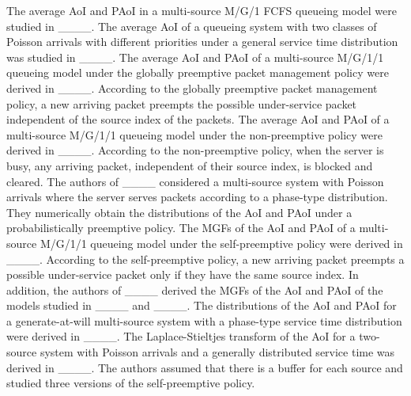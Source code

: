 The average AoI and PAoI in a multi-source M/G/1 FCFS queueing model were studied in    
____.
The average AoI of a queueing system with two classes of Poisson arrivals with different priorities under a general service time distribution was studied in ____. 
The average AoI and PAoI of a multi-source M/G/1/1 queueing model under the globally preemptive packet management policy were derived in ____.  According to the globally preemptive packet management policy, a new arriving packet preempts the possible under-service packet independent of the source index of the packets.
The average AoI and PAoI of a multi-source M/G/1/1 queueing model under the non-preemptive policy were derived in ____. According to the non-preemptive policy, when the server is busy, any arriving packet, independent of their source index, is blocked and cleared.  
 The authors of ____ considered a multi-source system with Poisson arrivals where the server serves packets according to a phase-type distribution. 
 They numerically obtain the distributions of the AoI and PAoI under a probabilistically preemptive policy. 
The MGFs of the AoI and PAoI of a multi-source M/G/1/1 queueing model under the self-preemptive policy were derived in ____. According to the self-preemptive policy, a new arriving packet preempts a possible under-service packet only if they have the same source index. In addition, the authors of ____ derived the MGFs of the AoI and PAoI of the models studied in ____ and ____.
The distributions of the AoI and PAoI for a generate-at-will multi-source system with a phase-type service time distribution were derived in ____.
The Laplace-Stieltjes transform of the AoI for a two-source system with Poisson arrivals and a generally distributed service time was derived in ____. The authors assumed that there is a buffer for each source and studied three versions of the self-preemptive policy. 





%